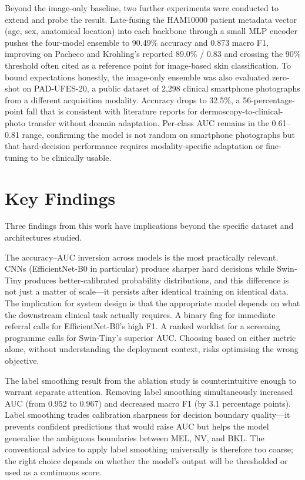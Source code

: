 Beyond the image-only baseline, two further experiments were conducted to extend and probe the result. Late-fusing the HAM10000 patient metadata vector (age, sex, anatomical location) into each backbone through a small MLP encoder pushes the four-model ensemble to 90.49\% accuracy and 0.873 macro F1, improving on Pacheco and Krohling's reported 89.0\% / 0.83 and crossing the 90\% threshold often cited as a reference point for image-based skin classification. To bound expectations honestly, the image-only ensemble was also evaluated zero-shot on PAD-UFES-20, a public dataset of 2,298 clinical smartphone photographs from a different acquisition modality. Accuracy drops to 32.5\%, a 56-percentage-point fall that is consistent with literature reports for dermoscopy-to-clinical-photo transfer without domain adaptation. Per-class AUC remains in the 0.61--0.81 range, confirming the model is not random on smartphone photographs but that hard-decision performance requires modality-specific adaptation or fine-tuning to be clinically usable.

\section{Key Findings}

Three findings from this work have implications beyond the specific dataset and architectures studied.

The accuracy--AUC inversion across models is the most practically relevant. CNNs (EfficientNet-B0 in particular) produce sharper hard decisions while Swin-Tiny produces better-calibrated probability distributions, and this difference is not just a matter of scale---it persists after identical training on identical data. The implication for system design is that the appropriate model depends on what the downstream clinical task actually requires. A binary flag for immediate referral calls for EfficientNet-B0's high F1. A ranked worklist for a screening programme calls for Swin-Tiny's superior AUC. Choosing based on either metric alone, without understanding the deployment context, risks optimising the wrong objective.

The label smoothing result from the ablation study is counterintuitive enough to warrant separate attention. Removing label smoothing simultaneously increased AUC (from 0.952 to 0.967) and decreased macro F1 (by 3.1 percentage points). Label smoothing trades calibration sharpness for decision boundary quality---it prevents confident predictions that would raise AUC but helps the model generalise the ambiguous boundaries between MEL, NV, and BKL. The conventional advice to apply label smoothing universally is therefore too coarse; the right choice depends on whether the model's output will be thresholded or used as a continuous score.

